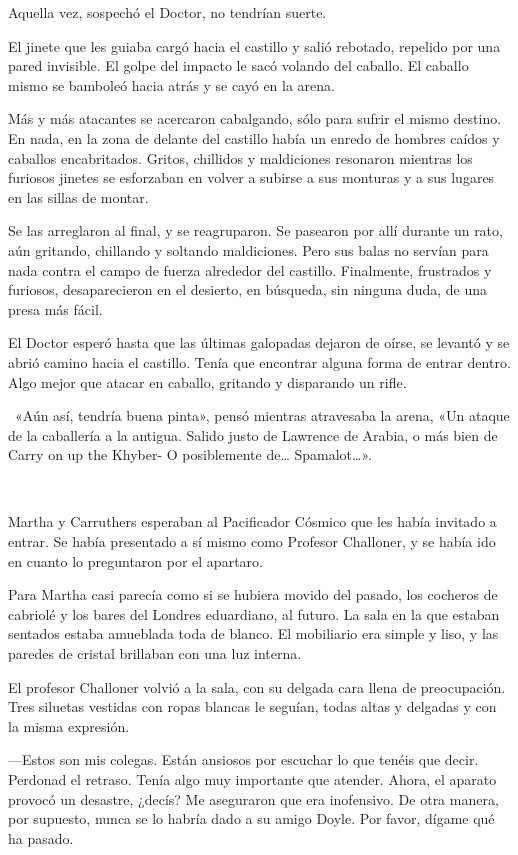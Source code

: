 Aquella vez, sospechó el Doctor, no tendrían suerte.

El jinete que les guiaba cargó hacia el castillo y salió rebotado,
repelido por una pared invisible. El golpe del impacto le sacó volando
del caballo. El caballo mismo se bamboleó hacia atrás y se cayó en la
arena.

Más y más atacantes se acercaron cabalgando, sólo para sufrir el mismo
destino. En nada, en la zona de delante del castillo había un enredo de
hombres caídos y caballos encabritados. Gritos, chillidos y maldiciones
resonaron mientras los furiosos jinetes se esforzaban en volver a
subirse a sus monturas y a sus lugares en las sillas de montar.

Se las arreglaron al final, y se reagruparon. Se pasearon por allí
durante un rato, aún gritando, chillando y soltando maldiciones. Pero
sus balas no servían para nada contra el campo de fuerza alrededor del
castillo. Finalmente, frustrados y furiosos, desaparecieron en el
desierto, en búsqueda, sin ninguna duda, de una presa más fácil.

El Doctor esperó hasta que las últimas galopadas dejaron de oírse, se
levantó y se abrió camino hacia el castillo. Tenía que encontrar alguna
forma de entrar dentro. Algo mejor que atacar en caballo, gritando y
disparando un rifle.

~«Aún así, tendría buena pinta», pensó mientras atravesaba la arena, «Un
ataque de la caballería a la antigua. Salido justo de Lawrence de
Arabia, o más bien de Carry on up the Khyber- O posiblemente de\ldots{}
Spamalot\ldots{}».

~

Martha y Carruthers esperaban al Pacificador Cósmico que les había
invitado a entrar. Se había presentado a sí mismo como Profesor
Challoner, y se había ido en cuanto lo preguntaron por el apartaro.

Para Martha casi parecía como si se hubiera movido del pasado, los
cocheros de cabriolé y los bares del Londres eduardiano, al futuro. La
sala en la que estaban sentados estaba amueblada toda de blanco. El
mobiliario era simple y liso, y las paredes de cristal brillaban con una
luz interna.

El profesor Challoner volvió a la sala, con su delgada cara llena de
preocupación. Tres siluetas vestidas con ropas blancas le seguían, todas
altas y delgadas y con la misma expresión.

---Estos son mis colegas. Están ansiosos por escuchar lo que tenéis que
decir. Perdonad el retraso. Tenía algo muy importante que atender.
Ahora, el aparato provocó un desastre, ¿decís? Me aseguraron que era
inofensivo. De otra manera, por supuesto, nunca se lo habría dado a su
amigo Doyle. Por favor, dígame qué ha pasado.

